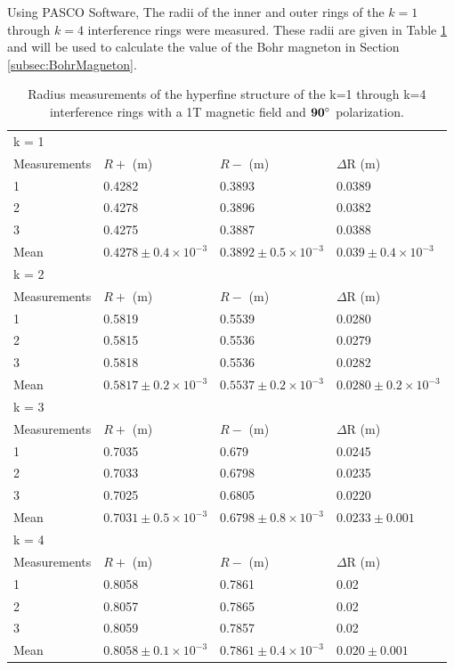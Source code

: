 \documentclass[twocolumn]{article}
\begin{document}
			Using PASCO Software, The radii of the inner and outer rings of the $k=1$ through $k=4$ interference rings were measured.
			These radii are given in Table \ref{tab:RadiusMeasurements} and will be used to calculate the value of the Bohr magneton in Section \ref{subsec:BohrMagneton}.
			\begin{table}[]
				\centering
				\begin{tabular}{l|lll}
					k = 1 & & & \\
					Measurements & $R+$ (m) & $R-$ (m)  & $\Delta$R (m) \\ \hline
					1         & 0.4282 & 0.3893  & 0.0389 \\
					2         & 0.4278 & 0.3896  & 0.0382 \\
					3         & 0.4275 & 0.3887  & 0.0388 \\
					Mean      & $0.4278\pm0.4\times10^{-3}$       & $0.3892\pm0.5\times10^{-3}$        & $0.039\pm0.4\times10^{-3}$ \\ \hline
					k = 2 & & & \\
					Measurements & $R+$ (m) & $R-$ (m)  & $\Delta$R (m) \\ \hline
					1           & 0.5819 & 0.5539 & 0.0280 \\
					2           & 0.5815 & 0.5536 & 0.0279 \\
					3           & 0.5818 & 0.5536 & 0.0282 \\
					Mean        & $0.5817\pm0.2\times10^{-3}$ & $0.5537\pm0.2\times10^{-3}$ & $0.0280\pm0.2\times10^{-3}$ \\ \hline
					k = 3 & & & \\
					Measurements & $R+$ (m) & $R-$ (m)  & $\Delta$R (m) \\ \hline
					1    & 0.7035 & 0.679  & 0.0245 \\
					2    & 0.7033 & 0.6798 & 0.0235 \\
					3    & 0.7025 & 0.6805 & 0.0220 \\
					Mean & $0.7031\pm0.5\times10^{-3}$ & $0.6798\pm0.8\times10^{-3}$ & $0.0233\pm0.001$ \\ \hline
					k = 4 & & & \\
					Measurements & $R+$ (m) & $R-$ (m)  & $\Delta$R (m) \\ \hline
					1    & 0.8058 & 0.7861 & 0.02  \\
					2    & 0.8057 & 0.7865 & 0.02  \\
					3    & 0.8059 & 0.7857 & 0.02  \\
					Mean & $0.8058\pm0.1\times10^{-3}$ & $0.7861\pm0.4\times10^{-3}$ & $0.020\pm0.001$
				\end{tabular}
				
				
				\caption{Radius measurements of the hyperfine structure of the k=1 through k=4 interference rings with a 1T magnetic field and $\mathbf{90\degree}$ polarization.}
				\label{tab:RadiusMeasurements}
			\end{table}
			
\end{document}
